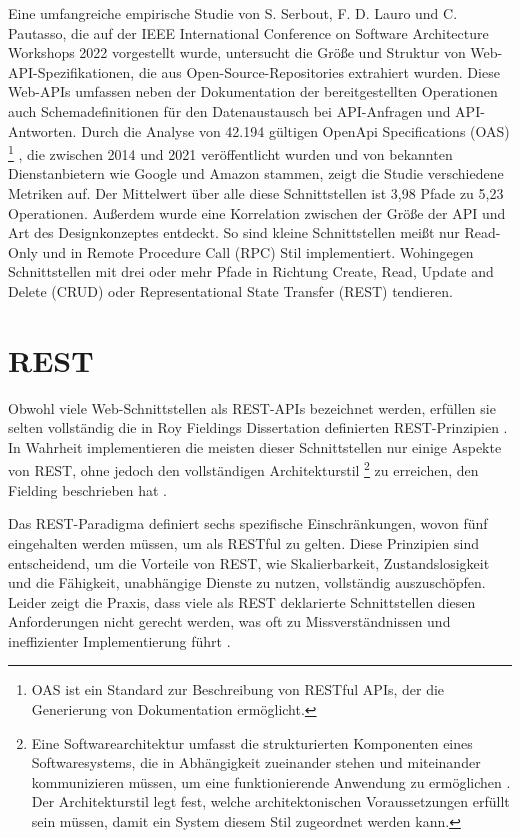 \documentclass[draft,final]{vutinfth} %
\begin{document}
Eine umfangreiche empirische Studie von S. Serbout,  F. D. Lauro und C. Pautasso, die auf der IEEE International Conference on Software Architecture Workshops 2022 vorgestellt wurde, untersucht die Größe und Struktur von Web-API-Spezifikationen, die aus Open-Source-Repositories extrahiert wurden. Diese Web-APIs umfassen neben der Dokumentation der bereitgestellten Operationen auch Schemadefinitionen für den Datenaustausch bei API-Anfragen und API-Antworten. 
Durch die Analyse von 42.194 gültigen OpenApi Specifications (OAS)
\footnote{
	OAS ist ein Standard zur Beschreibung von RESTful APIs, der die Generierung von Dokumentation ermöglicht.
}
, die zwischen 2014 und 2021 veröffentlicht wurden und von bekannten Dienstanbietern wie Google und Amazon stammen, zeigt die Studie verschiedene Metriken auf. 
Der Mittelwert über alle diese Schnittstellen ist 3,98 Pfade zu 5,23 Operationen. 
Außerdem wurde eine Korrelation zwischen der Größe der API und Art des Designkonzeptes entdeckt. 
So sind kleine Schnittstellen meißt nur Read-Only und in Remote Procedure Call (RPC) Stil implementiert. 
Wohingegen Schnittstellen mit drei oder mehr Pfade in Richtung Create, Read, Update and Delete (CRUD) oder Representational State Transfer (REST) tendieren. \cite{Serbout:2022:WebApiStructures}


\section{REST}


Obwohl viele Web-Schnittstellen als REST-APIs bezeichnet werden, erfüllen sie selten vollständig die in Roy Fieldings Dissertation definierten REST-Prinzipien \cite{Neumann:2021:AnalysisOfRest}. 
In Wahrheit implementieren die meisten dieser Schnittstellen nur einige Aspekte von REST, ohne jedoch den vollständigen Architekturstil
\footnote{
	Eine Softwarearchitektur umfasst die strukturierten Komponenten eines Softwaresystems, die in Abhängigkeit zueinander stehen und miteinander kommunizieren müssen, um eine funktionierende Anwendung zu ermöglichen \cite{Fielding:2000:REST}. 
	Der Architekturstil legt fest, welche architektonischen Voraussetzungen erfüllt sein müssen, damit ein System diesem Stil zugeordnet werden kann.
}
zu erreichen, den Fielding beschrieben hat \cite{Neumann:2021:AnalysisOfRest}.

Das REST-Paradigma definiert sechs spezifische Einschränkungen, wovon fünf eingehalten werden müssen, um als RESTful zu gelten. 
Diese Prinzipien sind entscheidend, um die Vorteile von REST, wie Skalierbarkeit, Zustandslosigkeit und die Fähigkeit, unabhängige Dienste zu nutzen, vollständig auszuschöpfen. 
Leider zeigt die Praxis, dass viele als REST deklarierte Schnittstellen diesen Anforderungen nicht gerecht werden, was oft zu Missverständnissen und ineffizienter Implementierung führt \cite{Neumann:2021:AnalysisOfRest}.
\end{document}
